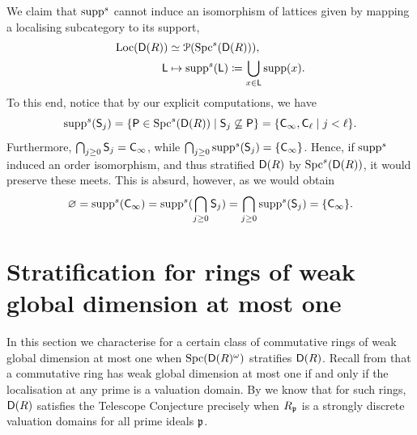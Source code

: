 \documentclass[reqno,a4paper]{amsart}
\begin{document}
\begin{example}
We claim that $\operatorname{supp}^s$ cannot induce an isomorphism of lattices given by mapping a localising subcategory to its support,
\begin{align*}
\operatorname{Loc}(\mathsf{D}(R)) &\simeq \operatorname{\mathcal{P}}(\operatorname{Spc}^s(\mathsf{D}(R))), \\
\mathsf{L} &\mapsto \operatorname{supp}^s(\mathsf{L})\coloneqq\bigcup_{x\in\mathsf{L}}\operatorname{supp}(x).
\end{align*}
To this end, notice that by our explicit computations, we have
\[
\operatorname{supp}^s(\mathsf{S}_j)=\{\mathsf{P}\in\operatorname{Spc}^s(\mathsf{D}(R))\mid\mathsf{S}_j\not\subseteq\mathsf{P}\}=\{\mathsf{C}_\infty,\mathsf{C}_\ell\mid j<\ell\}.
\]
Furthermore, $\bigcap_{j\ge0}\mathsf{S}_j=\mathsf{C}_\infty$, while $\bigcap_{j\ge0}\operatorname{supp}^s(\mathsf{S}_j)=\{\mathsf{C}_\infty\}$. Hence, if $\operatorname{supp}^s$ induced an order isomorphism, and thus stratified $\mathsf{D}(R)$ by $\operatorname{Spc}^s(\mathsf{D}(R))$, it would preserve these meets. This is absurd, however, as we would obtain
\[
\varnothing=\operatorname{supp}^s(\mathsf{C}_\infty)=\operatorname{supp}^s(\bigcap_{j\ge0}\mathsf{S}_j)=\bigcap_{j\ge0}\operatorname{supp}^s(\mathsf{S}_j)=\{\mathsf{C}_\infty\}.
\]
\end{example}


\section{Stratification for rings of weak global dimension at most one}
In this section we characterise for a certain class of commutative rings of weak global dimension at most one when $\operatorname{Spc}(\mathsf{D}(R)^\omega)$ stratifies $\mathsf{D}(R)$. 
Recall from  that a commutative ring has weak global dimension at most one if and only if the localisation at any prime is a valuation domain.
By \cite[\S 7]{gldm1} we know that for such rings, $\mathsf{D}(R)$ satisfies the Telescope Conjecture precisely when $R_{\mathfrak{p}}$ is a strongly discrete valuation domains for all prime ideals $\mathfrak{p}$.
\end{document}
